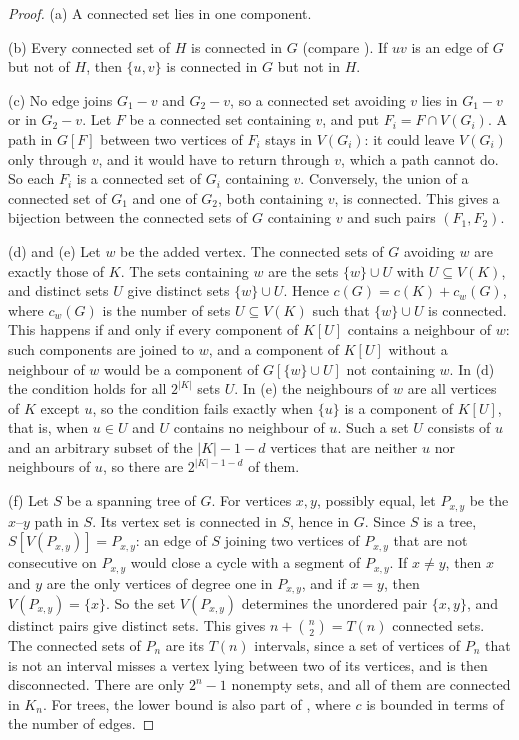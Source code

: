 \documentclass[11pt]{amsart}
\theoremstyle{definition}
\theoremstyle{remark}
\newcommand{\Tr}[1]{T(#1)}
\begin{document}
\begin{proof}
(a) A connected set lies in one component.

(b) Every connected set of $H$ is connected in $G$ (compare \cite[Lemma~1]{Vi}). If $uv$ is an edge of $G$ but not of $H$, then $\{u,v\}$ is connected in $G$ but not in $H$.

(c) No edge joins $G_1-v$ and $G_2-v$, so a connected set avoiding $v$ lies in $G_1-v$ or in $G_2-v$. Let $F$ be a connected set containing $v$, and put $F_i=F\cap V(G_i)$. A path in $G[F]$ between two vertices of $F_i$ stays in $V(G_i)$: it could leave $V(G_i)$ only through $v$, and it would have to return through $v$, which a path cannot do. So each $F_i$ is a connected set of $G_i$ containing $v$. Conversely, the union of a connected set of $G_1$ and one of $G_2$, both containing $v$, is connected. This gives a bijection between the connected sets of $G$ containing $v$ and such pairs $(F_1,F_2)$.

(d) and (e) Let $w$ be the added vertex. The connected sets of $G$ avoiding $w$ are exactly those of $K$. The sets containing $w$ are the sets $\{w\}\cup U$ with $U\subseteq V(K)$, and distinct sets $U$ give distinct sets $\{w\}\cup U$. Hence $c(G)=c(K)+c_w(G)$, where $c_w(G)$ is the number of sets $U\subseteq V(K)$ such that $\{w\}\cup U$ is connected. This happens if and only if every component of $K[U]$ contains a neighbour of $w$: such components are joined to $w$, and a component of $K[U]$ without a neighbour of $w$ would be a component of $G[\{w\}\cup U]$ not containing $w$. In (d) the condition holds for all $2^{|K|}$ sets $U$. In (e) the neighbours of $w$ are all vertices of $K$ except $u$, so the condition fails exactly when $\{u\}$ is a component of $K[U]$, that is, when $u\in U$ and $U$ contains no neighbour of $u$. Such a set $U$ consists of $u$ and an arbitrary subset of the $|K|-1-d$ vertices that are neither $u$ nor neighbours of $u$, so there are $2^{|K|-1-d}$ of them.

(f) Let $S$ be a spanning tree of $G$. For vertices $x,y$, possibly equal, let $P_{x,y}$ be the $x$--$y$ path in $S$. Its vertex set is connected in $S$, hence in $G$. Since $S$ is a tree, $S[V(P_{x,y})]=P_{x,y}$: an edge of $S$ joining two vertices of $P_{x,y}$ that are not consecutive on $P_{x,y}$ would close a cycle with a segment of $P_{x,y}$. If $x\ne y$, then $x$ and $y$ are the only vertices of degree one in $P_{x,y}$, and if $x=y$, then $V(P_{x,y})=\{x\}$. So the set $V(P_{x,y})$ determines the unordered pair $\{x,y\}$, and distinct pairs give distinct sets. This gives $n+\binom n2=\Tr{n}$ connected sets. The connected sets of $P_n$ are its $\Tr{n}$ intervals, since a set of vertices of $P_n$ that is not an interval misses a vertex lying between two of its vertices, and is then disconnected. There are only $2^n-1$ nonempty sets, and all of them are connected in $K_n$. For trees, the lower bound is also part of \cite[Theorem~4]{Vi}, where $c$ is bounded in terms of the number of edges.
\end{proof}
\end{document}
